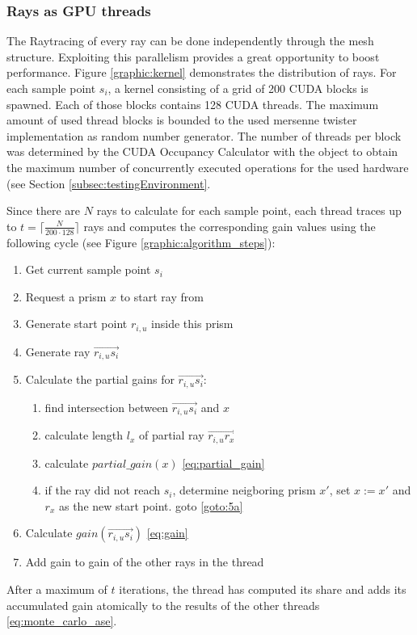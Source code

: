 \subsubsection{Rays as GPU threads}
    The Raytracing of every ray can be done independently through the mesh
    structure.  Exploiting this parallelism provides a great opportunity to
    boost performance. Figure \ref{graphic:kernel} demonstrates the distribution
    of rays. For each sample point $s_i$, a kernel consisting of a grid of 200
    CUDA blocks is spawned. Each of those blocks contains 128 CUDA threads.
    The maximum amount of used thread blocks is bounded to the used
    mersenne twister implementation\cite{mersenne_twister} as random number generator.
    The number of threads per block was determined by the CUDA Occupancy 
    Calculator\cite{occupancy_calculator} with the object to obtain the
    maximum number of concurrently executed operations for the used hardware
    (see Section \ref{subsec:testingEnvironment}.
    
    Since there are $N$ rays to calculate for each sample point, each thread
    traces up to $t = \lceil\frac {N}{200\cdot128}\rceil$ rays and computes the
    corresponding gain values using the following cycle (see Figure
    \ref{graphic:algorithm_steps}):
    
    \begin{enumerate}
      \item Get current sample point $s_i$
      \item Request a prism $x$ to start ray from
      \item Generate start point $r_{i,u}$ inside this prism 
      \item Generate ray $\overrightarrow{r_{i,u}s_i}$
      \item Calculate the partial gains for $\overrightarrow{r_{i,u}s_i}$:
        \begin{enumerate}
          \item find intersection between $\overrightarrow{r_{i,u}s_i}$
            and $x$\label{goto:5a}
          \item calculate length $l_x$ of partial ray $\overrightarrow{r_{i,u}r_x}$
          \item calculate $partial\_gain(x)$ \eqref{eq:partial_gain}
          \item if the ray did not reach $s_i$, determine neigboring prism $x'$,
            set $x := x'$ and $r_x$ as the new start point. goto \ref{goto:5a} 
        \end{enumerate}
      \item Calculate $gain(\overrightarrow{r_{i,u}s_i})$ \eqref{eq:gain}
      \item Add gain to gain of the other rays in the thread
    \end{enumerate}
    After a maximum of $t$ iterations, the thread has computed its share and
    adds its accumulated gain atomically to the results of the other threads
    \eqref{eq:monte_carlo_ase}.


